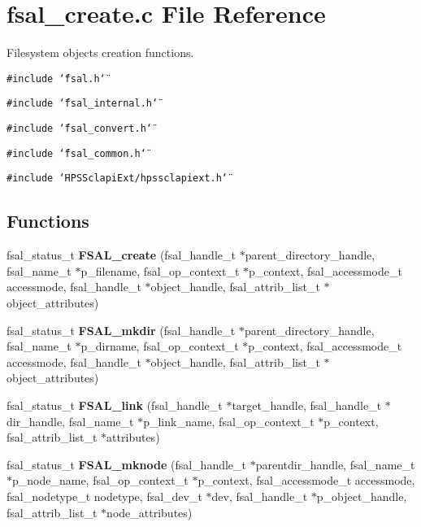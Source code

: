 \section{fsal\_\-create.c File Reference}
\label{fsal__create_8c}
Filesystem objects creation functions.  


{\tt \#include \char`\"{}fsal.h\char`\"{}}\par
{\tt \#include \char`\"{}fsal\_\-internal.h\char`\"{}}\par
{\tt \#include \char`\"{}fsal\_\-convert.h\char`\"{}}\par
{\tt \#include \char`\"{}fsal\_\-common.h\char`\"{}}\par
{\tt \#include \char`\"{}HPSSclapiExt/hpssclapiext.h\char`\"{}}\par
\subsection*{Functions}
\begin{CompactItemize}
\item 
fsal\_\-status\_\-t {\bf FSAL\_\-create} (fsal\_\-handle\_\-t $\ast$parent\_\-directory\_\-handle, fsal\_\-name\_\-t $\ast$p\_\-filename, fsal\_\-op\_\-context\_\-t $\ast$p\_\-context, fsal\_\-accessmode\_\-t accessmode, fsal\_\-handle\_\-t $\ast$object\_\-handle, fsal\_\-attrib\_\-list\_\-t $\ast$object\_\-attributes)
\item 
fsal\_\-status\_\-t {\bf FSAL\_\-mkdir} (fsal\_\-handle\_\-t $\ast$parent\_\-directory\_\-handle, fsal\_\-name\_\-t $\ast$p\_\-dirname, fsal\_\-op\_\-context\_\-t $\ast$p\_\-context, fsal\_\-accessmode\_\-t accessmode, fsal\_\-handle\_\-t $\ast$object\_\-handle, fsal\_\-attrib\_\-list\_\-t $\ast$object\_\-attributes)
\item 
fsal\_\-status\_\-t {\bf FSAL\_\-link} (fsal\_\-handle\_\-t $\ast$target\_\-handle, fsal\_\-handle\_\-t $\ast$dir\_\-handle, fsal\_\-name\_\-t $\ast$p\_\-link\_\-name, fsal\_\-op\_\-context\_\-t $\ast$p\_\-context, fsal\_\-attrib\_\-list\_\-t $\ast$attributes)
\item 
fsal\_\-status\_\-t {\bf FSAL\_\-mknode} (fsal\_\-handle\_\-t $\ast$parentdir\_\-handle, fsal\_\-name\_\-t $\ast$p\_\-node\_\-name, fsal\_\-op\_\-context\_\-t $\ast$p\_\-context, fsal\_\-accessmode\_\-t accessmode, fsal\_\-nodetype\_\-t nodetype, fsal\_\-dev\_\-t $\ast$dev, fsal\_\-handle\_\-t $\ast$p\_\-object\_\-handle, fsal\_\-attrib\_\-list\_\-t $\ast$node\_\-attributes)
\end{CompactItemize}


